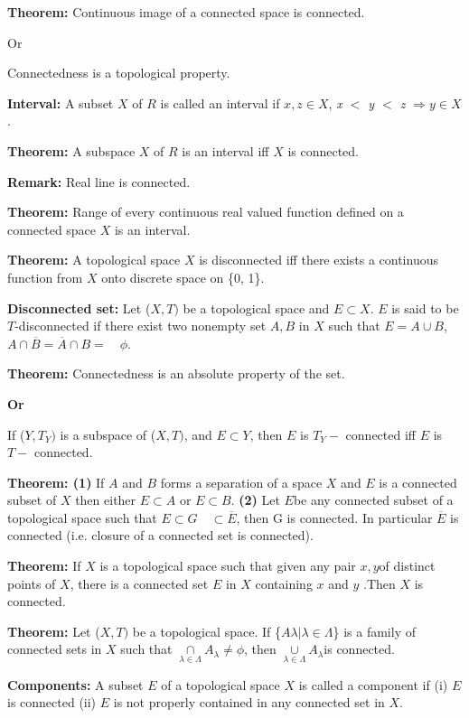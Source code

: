 \documentclass[12pt]{amsart}
\begin{document}
\textbf{Theorem:} Continuous image of a connected space is connected.

Or

Connectedness is a topological property.

\textbf{Interval:} A subset $X$ of $R$ is called an interval if $x, z\in X$, \textit{x $<$ y $<$ z }$\Rightarrow 
y\in X$.

\textbf{Theorem:} A subspace $X$ of $R$ is an interval iff $X$ is connected.

\textbf{Remark:} Real line is connected.

\textbf{Theorem:} Range of every continuous real valued function defined on 
a connected space $X$ is an interval.

\textbf{Theorem:} A topological space $X$ is disconnected iff there exists a 
continuous function from $X$ onto discrete space on {\{}0, 1{\}}.

\textbf{Disconnected set:} Let ($X, T )$ be a topological space and $E\subset X$. $E$ is 
said to be $T$-disconnected if there exist two nonempty set $A, B$ in $X$ such that $E = A\cup 
B$, $A\cap \overline B =\overline A \cap B = \quad \phi $.

\textbf{Theorem:} Connectedness is an absolute property of the set.

\textbf{Or}

If ($Y, T_{Y })$ is a subspace of ($X, T )$, and $E\subset Y$, then $E$ is $T_{Y} -$ connected 
iff $E$ is $T -$ connected.

\textbf{Theorem: (1)} If $A$ and $B$ forms a separation of a space $X$ and $E$ is a 
connected subset of $X$ then either $E\subset A$ or $E\subset B$. \textbf{(2)} Let 
$E $be any connected subset of a topological space such that $E\subset G \quad \subset 
\overline E $, then G is connected. In particular $\overline E $ is 
connected (i.e. closure of a connected set is connected).

\textbf{Theorem:} If $X$ is a topological space such that given any pair $x, y $of 
distinct points of $X$, there is a connected set $E$ in $X$ containing $x$ and $y$ .Then 
$X$ is connected.

\textbf{Theorem:} Let ($X, T)$ be a topological space. If {\{}$A\lambda \vert 
\lambda \in \Lambda ${\}} is a family of connected sets in $X$ such that 
$\mathop \cap \limits_{\lambda \in \Lambda } A_\lambda \ne \phi $, then 
$\mathop \cup \limits_{\lambda \in \Lambda } A_\lambda $is connected.

\textbf{Components:} A subset $E$ of a topological space $X$ is called a component 
if (i) $E$ is connected (ii) $E$ is not properly contained in any connected set in 
$X$.
\end{document}
